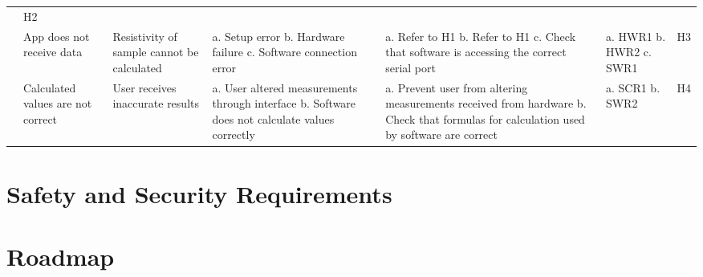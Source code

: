 \documentclass{article}
\begin{document}
\begin{landscape}
\begin{table}[h]
\begin{tabular}{|P{20mm}|P{30mm}|P{30mm}|P{30mm}|P{35mm}|P{20mm}|P{10mm}|}
    & H2 \\ 
    & App does not receive data
    & Resistivity of sample cannot be calculated
    & a. Setup error \newline
      b. Hardware failure \newline
      c. Software connection error
    & a. Refer to H1 \newline
      b. Refer to H1 \newline
      c. Check that software is accessing the correct serial port
    & a. HWR1 \newline
      b. HWR2 \newline
      c. SWR1
    & H3  \\ 
    & Calculated values are not correct
    & User receives inaccurate results
    & a. User altered measurements through interface \newline
      b. Software does not calculate values correctly
    & a. Prevent user from altering measurements received from hardware \newline
      b. Check that formulas for calculation used by software are correct
    & a. SCR1 \newline
      b. SWR2
    & H4  \\ \hline 

  \end{tabular}
\end{table}
\end{landscape}



\section{Safety and Security Requirements}


\section{Roadmap}

\end{document}
